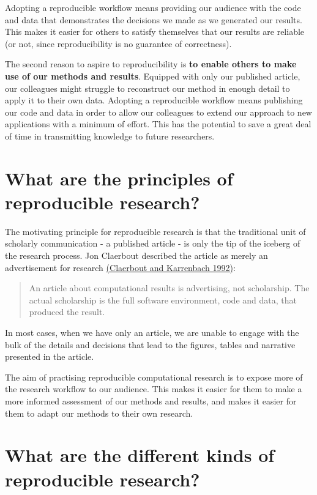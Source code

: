 \documentclass[
]{book}
\begin{document}
Adopting a reproducible workflow means providing our audience with the code and data that demonstrates the decisions we made as we generated our results. This makes it easier for others to satisfy themselves that our results are reliable (or not, since reproducibility is no guarantee of correctness).

The second reason to aspire to reproducibility is \textbf{to enable others to make use of our methods and results}. Equipped with only our published article, our colleagues might struggle to reconstruct our method in enough detail to apply it to their own data. Adopting a reproducible workflow means publishing our code and data in order to allow our colleagues to extend our approach to new applications with a minimum of effort. This has the potential to save a great deal of time in transmitting knowledge to future researchers.

\hypertarget{what-are-the-principles-of-reproducible-research}{%
\section{What are the principles of reproducible research?}\label{what-are-the-principles-of-reproducible-research}}

The motivating principle for reproducible research is that the traditional unit of scholarly communication - a published article - is only the tip of the iceberg of the research process. Jon Claerbout described the article as merely an advertisement for research \href{http://sepwww.stanford.edu/doku.php?id=sep:research:reproducible:seg92}{(Claerbout and Karrenbach 1992)}:

\begin{quote}
An article about computational results is advertising, not scholarship. The actual scholarship is the full software environment, code and data, that produced the result.
\end{quote}

In most cases, when we have only an article, we are unable to engage with the bulk of the details and decisions that lead to the figures, tables and narrative presented in the article.

The aim of practising reproducible computational research is to expose more of the research workflow to our audience. This makes it easier for them to make a more informed assessment of our methods and results, and makes it easier for them to adapt our methods to their own research.

\hypertarget{what-are-the-different-kinds-of-reproducible-research}{%
\section{What are the different kinds of reproducible research?}\label{what-are-the-different-kinds-of-reproducible-research}}
\end{document}
